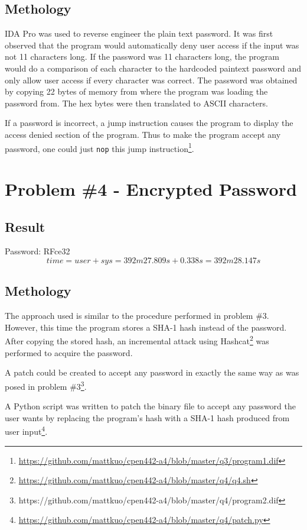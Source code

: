 \documentclass[conference]{IEEEtran}
\begin{document}
\subsection{Methology}
IDA Pro was used to reverse engineer the plain text password. It was first
observed that the program would automatically deny user access if the input was
not 11 characters long. If the password was 11 characters long, the program
would do a comparison of each character to the hardcoded paintext password and
only allow user access if every character was correct. The password was obtained
by copying 22 bytes of memory from where the program was loading the password
from. The hex bytes were then translated to ASCII characters.

If a password is incorrect, a jump instruction causes the program to display the
access denied section of the program. Thus to make the program accept any
password, one could just \texttt{nop} this jump
instruction\footnote{\url{https://github.com/mattkuo/cpen442-a4/blob/master/q3/program1.dif}}.

\section{Problem \#4 - Encrypted Password}
\subsection{Result}
  \noindent Password: RFce32
  \begin{displaymath}
  time = user + sys = 392m27.809s + 0.338s = 392m28.147s
  \end{displaymath}

\subsection{Methology}

The approach used is similar to the procedure performed in problem \#3. However,
this time the program stores a SHA-1 hash instead of the password. After copying
the stored hash, an incremental attack using
Hashcat\footnote{\url{https://github.com/mattkuo/cpen442-a4/blob/master/q4/q4.sh}}
was performed to acquire the password.

A patch could be created to accept any password in exactly the same way as was
posed in problem \#3\footnote{https://github.com/mattkuo/cpen442-a4/blob/master/q4/program2.dif}.

A Python script was written to patch the binary file to accept any password the
user wants by replacing the program's hash with a SHA-1 hash produced from user
input\footnote{\url{https://github.com/mattkuo/cpen442-a4/blob/master/q4/patch.py}}.
\end{document}
